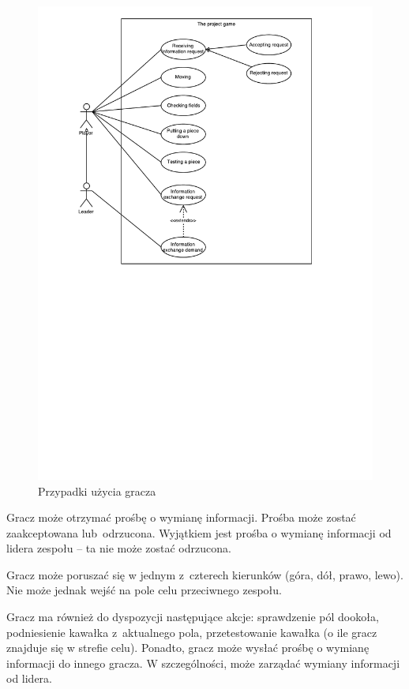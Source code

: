 \documentclass[a4paper]{article}
\begin{document}
\begin{figure}[H]
\caption{Przypadki użycia gracza}
\centering
\includegraphics[scale=0.9]{przypadki_uzycia_gracz_lider.pdf}
\end{figure}

Gracz może otrzymać prośbę o wymianę informacji.
Prośba może zostać zaakceptowana lub~odrzucona.
Wyjątkiem jest prośba o wymianę informacji od lidera zespołu -- ta nie może zostać odrzucona.

Gracz może poruszać się w jednym z~czterech kierunków (góra, dół, prawo, lewo).
Nie może jednak wejść na pole celu przeciwnego zespołu.

Gracz ma również do dyspozycji następujące akcje: sprawdzenie pól dookoła, podniesienie kawałka z~aktualnego pola, przetestowanie kawałka (o ile gracz znajduje się w strefie celu).
Ponadto, gracz może wysłać prośbę o wymianę informacji do innego gracza.
W szczególności, może zarządać wymiany informacji od lidera.
\end{document}

